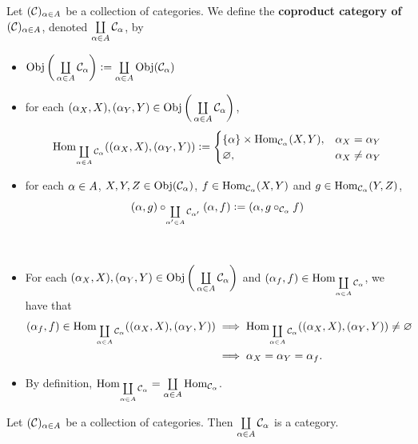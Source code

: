 \documentclass{book}
\begin{document}
	\begin{defn} 
		Let $(\mathcal{C})_{\alpha \in A}$ be a collection of categories. We define the \textbf{coproduct category of $(\mathcal{C})_{\alpha \in A}$}, denoted $\coprod\limits_{\alpha \in A} \mathcal{C}_{\alpha}$, by 
		\begin{itemize}
			\item $\operatorname{Obj} \bigg(\coprod\limits_{\alpha \in A} \mathcal{C}_{\alpha} \bigg) \vcentcolon= \coprod\limits_{\alpha \in A} \operatorname{Obj}(\mathcal{C}_{\alpha})$
			\item for each $(\alpha_X, X), (\alpha_Y, Y) \in \operatorname{Obj} \bigg(\coprod\limits_{\alpha \in A} \mathcal{C}_{\alpha} \bigg)$, 
			\[
			\operatorname{Hom}_{\coprod\limits_{\alpha \in A} \mathcal{C}_{\alpha}}((\alpha_X, X), (\alpha_Y, Y)) \vcentcolon= 
			\begin{cases}
				\{\alpha \} \times \operatorname{Hom}_{\mathcal{C}_{\alpha}}(X, Y), & \alpha_X = \alpha_Y \\
				\varnothing, & \alpha_X \neq \alpha_Y 
			\end{cases}
			\]
			\item for each $\alpha \in A$, $X,Y,Z \in \operatorname{Obj}(\mathcal{C}_{\alpha}) $, $f \in \operatorname{Hom}_{\mathcal{C}_{\alpha}}(X, Y)$ and $g \in \operatorname{Hom}_{\mathcal{C}_{\alpha}}(Y, Z)$, 
			$$(\alpha, g) \circ_{\coprod\limits_{\alpha' \in A} \mathcal{C}_{\alpha'}} (\alpha, f) \vcentcolon=  (\alpha, g \circ_{\mathcal{C}_{\alpha}} f)$$
		\end{itemize}
	\end{defn}
	
	\begin{note}\
		\begin{itemize}
			\item For each $(\alpha_X, X), (\alpha_Y, Y) \in \operatorname{Obj} \bigg( \coprod\limits_{\alpha \in A} \mathcal{C}_{\alpha} \bigg)$ and $(\alpha_f, f) \in \operatorname{Hom}_{ \coprod\limits_{\alpha \in A} \mathcal{C}_{\alpha}}$, we have that
			\begin{align*}
				(\alpha_f, f) \in \operatorname{Hom}_{ \coprod\limits_{\alpha \in A} \mathcal{C}_{\alpha}}((\alpha_X, X), (\alpha_Y, Y))
				& \implies \operatorname{Hom}_{ \coprod\limits_{\alpha \in A} \mathcal{C}_{\alpha} }((\alpha_X, X), (\alpha_Y, Y)) \neq \varnothing \\
				& \implies \alpha_X = \alpha_Y = \alpha_f.
			\end{align*}
			\item By definition, $\operatorname{Hom}_{\coprod\limits_{\alpha \in A} \mathcal{C}_{\alpha}}  = \coprod\limits_{\alpha \in A} \operatorname{Hom}_{\mathcal{C}_{\alpha}}$.
		\end{itemize}
	\end{note}
	
	\begin{ex} 
		Let $(\mathcal{C})_{\alpha \in A}$ be a collection of categories. Then $\coprod\limits_{\alpha \in A} \mathcal{C}_{\alpha}$ is a category. 
	\end{ex}
	
\end{document}
